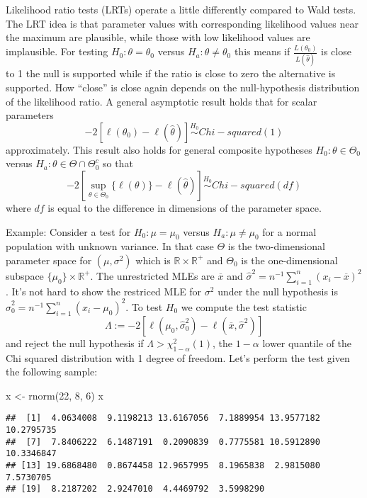\documentclass[
]{book}
\newenvironment{Shaded}{\begin{snugshade}}{\end{snugshade}}
\newcommand{\DecValTok}[1]{\textcolor[rgb]{0.00,0.00,0.81}{#1}}
\newcommand{\FunctionTok}[1]{\textcolor[rgb]{0.00,0.00,0.00}{#1}}
\newcommand{\NormalTok}[1]{#1}
\newcommand{\OtherTok}[1]{\textcolor[rgb]{0.56,0.35,0.01}{#1}}
\begin{document}
Likelihood ratio tests (LRTs) operate a little differently compared to Wald tests. The LRT idea is that parameter values with corresponding likelihood values near the maximum are plausible, while those with low likelihood values are implausible. For testing \(H_0:\theta = \theta_0\) versus \(H_a:\theta\ne \theta_0\) this means if \(\frac{L(\theta_0)}{L(\hat\theta)}\) is close to 1 the null is supported while if the ratio is close to zero the alternative is supported. How ``close'' is close again depends on the null-hypothesis distribution of the likelihood ratio. A general asymptotic result holds that for scalar parameters
\[-2[\ell(\theta_0) - \ell(\hat\theta)] \stackrel{H_0}{\sim} Chi-squared(1)\]
approximately. This result also holds for general composite hypotheses \(H_0:\theta\in \Theta_0\) versus \(H_a: \theta\in \Theta \cap \Theta_0^c\) so that
\[-2[\sup_{\theta\in \Theta_0}\{\ell(\theta)\} - \ell(\hat\theta)]\stackrel{H_0}{\sim} Chi-squared(df)\]
where \(df\) is equal to the difference in dimensions of the parameter space.

Example: Consider a test for \(H_0:\mu = \mu_0\) versus \(H_a:\mu \ne \mu_0\) for a normal population with unknown variance. In that case \(\Theta\) is the two-dimensional parameter space for \((\mu, \sigma^2)\) which is \(\mathbb{R}\times \mathbb{R}^+\) and \(\Theta_0\) is the one-dimensional subspace \(\{\mu_0\}\times \mathbb{R}^+\). The unrestricted MLEs are \(\overline x\) and \(\hat\sigma^2 = n^{-1}\sum_{i=1}^n(x_i - \overline x)^2\). It's not hard to show the restriced MLE for \(\sigma^2\) under the null hypothesis is \(\hat\sigma_0^2 = n^{-1}\sum_{i=1}^n (x_i - \mu_0)^2\). To test \(H_0\) we compute the test statistic
\[\Lambda := -2[\ell(\mu_0, \hat\sigma_0^2) - \ell(\overline x, \hat\sigma^2)]\]
and reject the null hypothesis if \(\Lambda > \chi^2_{1-\alpha}(1)\), the \(1-\alpha\) lower quantile of the Chi squared distribution with 1 degree of freedom. Let's perform the test given the following sample:

\begin{Shaded}
\begin{Highlighting}[]
\NormalTok{x }\OtherTok{\textless{}{-}} \FunctionTok{rnorm}\NormalTok{(}\DecValTok{22}\NormalTok{, }\DecValTok{8}\NormalTok{, }\DecValTok{6}\NormalTok{)}
\NormalTok{x}
\end{Highlighting}
\end{Shaded}

\begin{verbatim}
##  [1]  4.0634008  9.1198213 13.6167056  7.1889954 13.9577182 10.2795735
##  [7]  7.8406222  6.1487191  0.2090839  0.7775581 10.5912890 10.3346847
## [13] 19.6868480  0.8674458 12.9657995  8.1965838  2.9815080  7.5730705
## [19]  8.2187202  2.9247010  4.4469792  3.5998290
\end{verbatim}
\end{document}
